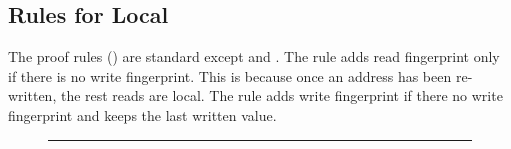 \subsection{Rules for Local}

The proof rules () are standard except  and .
The  rule adds read fingerprint only if there is no write fingerprint.
This is because once an address has been re-written, the rest reads are local.
The rule adds write fingerprint if there no write fingerprint and keeps the last written value.


\begin{figure}[!t]
\hrule
{}



\end{figure}
